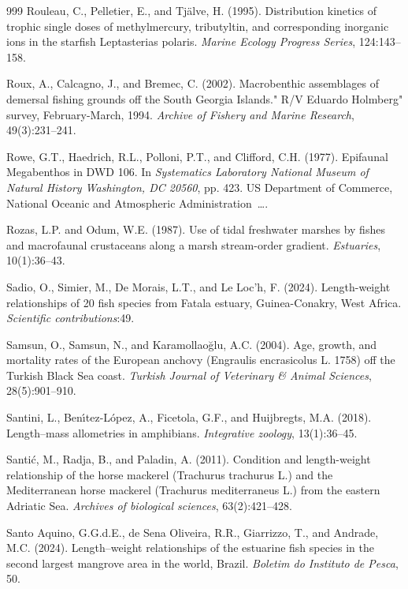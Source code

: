 \begin{thebibliography}{999}
Rouleau, C., Pelletier, E., and Tj{\"a}lve, H. (1995). Distribution kinetics of trophic single doses of methylmercury, tributyltin, and corresponding inorganic ions in the starfish Leptasterias polaris. \textit{Marine Ecology Progress Series}, 124:143--158.

Roux, A., Calcagno, J., and Bremec, C. (2002). Macrobenthic assemblages of demersal fishing grounds off the South Georgia Islands." R/V Eduardo Holmberg" survey, February-March, 1994. \textit{Archive of Fishery and Marine Research}, 49(3):231--241.

Rowe, G.T., Haedrich, R.L., Polloni, P.T., and Clifford, C.H. (1977). Epifaunal Megabenthos in DWD 106. In \textit{Systematics Laboratory National Museum of Natural History Washington, DC 20560}, pp. 423. US Department of Commerce, National Oceanic and Atmospheric Administration~{\ldots}.

Rozas, L.P. and Odum, W.E. (1987). Use of tidal freshwater marshes by fishes and macrofaunal crustaceans along a marsh stream-order gradient. \textit{Estuaries}, 10(1):36--43.

Sadio, O., Simier, M., De Morais, L.T., and Le Loc'h, F. (2024). Length-weight relationships of 20 fish species from Fatala estuary, Guinea-Conakry, West Africa. \textit{Scientific contributions}:49.

Samsun, O., Samsun, N., and Karamollao{\u{g}}lu, A.C. (2004). Age, growth, and mortality rates of the European anchovy (Engraulis encrasicolus L. 1758) off the Turkish Black Sea coast. \textit{Turkish Journal of Veterinary \& Animal Sciences}, 28(5):901--910.

Santini, L., Ben{\'\i}tez-L{\'o}pez, A., Ficetola, G.F., and Huijbregts, M.A. (2018). Length--mass allometries in amphibians. \textit{Integrative zoology}, 13(1):36--45.

Santi{\'c}, M., Radja, B., and Paladin, A. (2011). Condition and length-weight relationship of the horse mackerel (Trachurus trachurus L.) and the Mediterranean horse mackerel (Trachurus mediterraneus L.) from the eastern Adriatic Sea. \textit{Archives of biological sciences}, 63(2):421--428.

Santo Aquino, G.G.d.E., de Sena Oliveira, R.R., Giarrizzo, T., and Andrade, M.C. (2024). Length--weight relationships of the estuarine fish species in the second largest mangrove area in the world, Brazil. \textit{Boletim do Instituto de Pesca}, 50.


\end{thebibliography}
